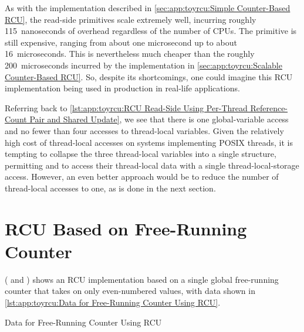 As with the implementation described in
\cref{sec:app:toyrcu:Simple Counter-Based RCU},
the read-side primitives scale extremely well, incurring roughly
115~nanoseconds of overhead regardless of the number of CPUs.
The  primitive is still expensive,
ranging from about one microsecond up to about 16~microseconds.
This is nevertheless much cheaper than the roughly 200~microseconds
incurred by the implementation in
\cref{sec:app:toyrcu:Scalable Counter-Based RCU}.
So, despite its shortcomings, one could imagine this
RCU implementation being used in production in real-life applications.

\QuickQuizEnd

Referring back to
\cref{lst:app:toyrcu:RCU Read-Side Using Per-Thread Reference-Count Pair and Shared Update},
we see that there is one global-variable access and no fewer than four
accesses to thread-local variables.
Given the relatively high cost of thread-local accesses on systems
implementing POSIX threads, it is tempting to collapse the three
thread-local variables into a single structure, permitting
 and  to access their
thread-local data with a single thread-local-storage access.
However, an even better approach would be to reduce the number of
thread-local accesses to one, as is done in the next section.

\section{RCU Based on Free-Running Counter}
\label{sec:app:toyrcu:RCU Based on Free-Running Counter}

( and )
shows an RCU implementation based on a single global free-running counter
that takes on only even-numbered values, with data shown in
\cref{lst:app:toyrcu:Data for Free-Running Counter Using RCU}.

\begin{listing}[tbp]

\caption{Data for Free-Running Counter Using RCU}
\label{lst:app:toyrcu:Data for Free-Running Counter Using RCU}
\end{listing}

